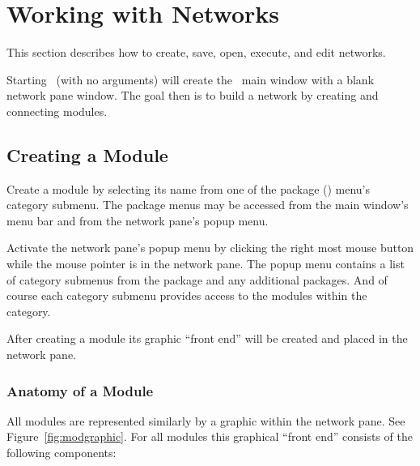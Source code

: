 %

  \newcommand{\modgraphic}%
  {\centerline{\epsfig{file=figures/modgraphic.eps,width=\columnwidth}}}
\begin{htmlonly}
  \newcommand{\srwindow}{%
  \htmladdimg[align=top,width=6,alt="SCIRun Window"]
  {../figures/modgraphic.gif}}
\end{htmlonly}

\section{Working with Networks}
\label{sec:workwithnets}

This section describes how to create, save, open, execute, and edit
networks.

Starting \sr\ (with no arguments) will create the \sr\ main window with a
blank network pane window.  The goal then is to build a network by
creating and connecting modules.


\subsection{Creating a Module}
\label{sec:creatingmodules}

Create a module by selecting its name from one of the package (\eg \sr)
menu's category submenu.  The package menus may be accessed from the main
window's menu bar and from the network pane's popup menu.

Activate the network pane's popup menu by clicking the right most mouse
button while the mouse pointer is in the network pane.  The popup menu
contains a list of category submenus from the \sr package and any
additional packages.  And of course each category submenu provides access
to the modules within the category.

After creating a module its graphic ``front end'' will be created and
placed in the network pane.

\subsubsection{Anatomy of a Module}
\label{sec:modanatomy}

All modules are represented similarly by a graphic within the network pane.
See Figure~\ref{fig:modgraphic}. For all modules this graphical ``front
end'' consists of the following components:

